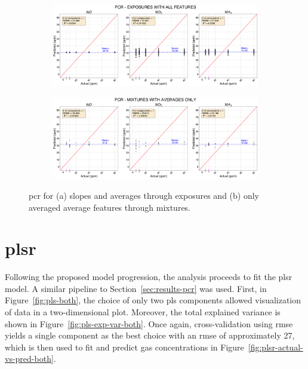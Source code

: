 \begin{figure}[!htb]
	\centering
	
	\begin{subfigure}[t]{1\textwidth}
		\includegraphics[width=1\linewidth]{../figures/pcr-act-vs-pred.png}
		\caption{}
		\label{fig:pcr-act-vs-pred} 
	\end{subfigure}
	
	\begin{subfigure}[t]{1\textwidth}
		\includegraphics[width=1\linewidth]{../figures/pcr-act-vs-pred-avg-feat.png}
		\caption{}
		\label{fig:pcr-act-vs-pred-avg-feat}
	\end{subfigure}
	
	\caption{\acrshort{pcr} for (a) slopes and averages through exposures and (b) only averaged average features through mixtures.}
	\label{fig:pcr-both}
\end{figure}

\clearpage
\section{\acrlong{plsr}}
\label{sec:results-plsr}

Following the proposed model progression, the analysis proceeds to fit the \acrshort{plsr} model. A similar pipeline to Section~\ref{sec:results-pcr} was used. First, in Figure~\ref{fig:pls-both}, the choice of only two \acrshort{pls} components allowed visualization of data in a two-dimensional plot. Moreover, the total explained variance is shown in Figure~\ref{fig:pls-exp-var-both}. Once again, cross-validation using \acrshort{rmse} yields a single component as the best choice with an \acrshort{rmse} of approximately 27, which is then used to fit and predict gas concentrations in Figure~\ref{fig:plsr-actual-vs-pred-both}.

